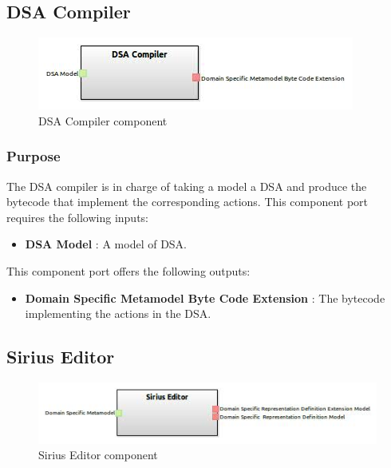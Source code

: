 \documentclass{gemoc} %
\begin{document}
\subsection{DSA Compiler}

\begin{figure}[htp]
	\begin{center}
	\includegraphics*[trim=0.0cm 0.0cm 0cm 0.0cm, clip=true, scale=1.0]{../images/generated/Generated_DSA Compiler.jpg}
	\caption{DSA Compiler component}
	\end{center}
\end{figure}

\subsubsection{Purpose}
The DSA compiler is in charge of taking a model a DSA and produce the bytecode that implement the corresponding actions.
This component port requires the following inputs:
\begin{itemize}
  \item \textbf{DSA Model} :
A model of DSA.
\end{itemize}

This component port offers the following outputs:
\begin{itemize}
  \item \textbf{Domain Specific Metamodel Byte Code Extension} :
The bytecode implementing the actions in the DSA.
\end{itemize}

\subsection{Sirius Editor}

\begin{figure}[htp]
	\begin{center}
	\includegraphics*[trim=0.0cm 0.0cm 0cm 0.0cm, clip=true, scale=1.0]{../images/generated/Generated_Sirius Editor.jpg}
	\caption{Sirius Editor component}
	\end{center}
\end{figure}
\end{document}
